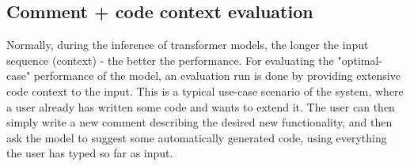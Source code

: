 



%    



\subsection{Comment + code context evaluation}
\label{sec:eval-rq1-comment-pluss-code-context}
Normally, during the inference of transformer models, the longer the input sequence (context) - the better the performance. For evaluating the "optimal-case" performance of the model, an evaluation run is done by providing extensive code context to the input. This is a typical use-case scenario of the system, where a user already has written some code and wants to extend it. The user can then simply write a new comment describing the desired new functionality, and then ask the model to suggest some automatically generated code, using everything the user has typed so far as input.


